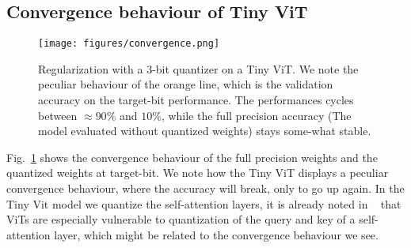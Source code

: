 \subsection{Convergence behaviour of Tiny ViT}
\label{appendix:robustness_convergence}
\begin{figure}[H]
    \centering
    \texttt{[image: figures/convergence.png]}
    \hfill
    \caption{Regularization with a 3-bit quantizer on a Tiny ViT. We note the peculiar behaviour of the orange line, which is the validation accuracy on the target-bit performance. The performances cycles between $\approx 90\%$ and $10\%$, while the full precision accuracy (The model evaluated without quantized weights) stays some-what stable.}
    \label{fig:convergence_plot}
\end{figure}
Fig.~\ref{fig:convergence_plot} shows the convergence behaviour of the full precision weights and the quantized weights at target-bit. We note how the Tiny ViT displays a peculiar convergence behaviour, where the accuracy will break, only to go up again. In the Tiny Vit model we quantize the self-attention layers, it is already noted in ~\citet{vitoscillations} that ViTs are especially vulnerable to quantization of the query and key of a self-attention layer, which might be related to the convergence behaviour we see.

    \hfill
    \hfill

